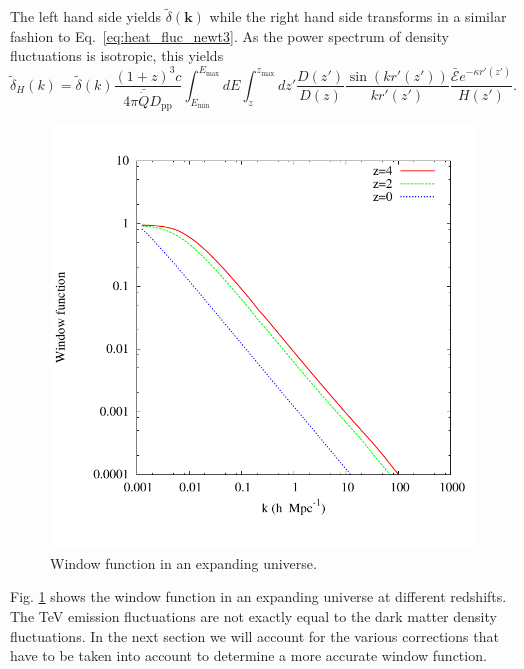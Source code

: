\documentclass[numberedappendix]{emulateapj}
\begin{document}
The left hand side yields $\tilde{\delta}(\mathbf{k})$ while the right hand side transforms in a similar fashion to Eq.~\eqref{eq:heat_fluc_newt3}. As the power spectrum of density fluctuations is isotropic, this yields
\begin{equation}
\label{eq:heat_fluc_exp1}
\tilde{\delta}_H(k)=\tilde{\delta}(k) \frac{(1+z)^3c}{4\pi\bar{\dot{Q}}D_{\mathrm{pp}}} \int_{E_{\mathrm{min}}}^{E_{\mathrm{max}}} dE\int_z^{z_{\mathrm{max}}} dz' \frac{D(z')}{D(z)}\frac{\sin(kr'(z'))}{kr'(z')} \frac{\bar{\mathcal{E}}e^{-\kappa r'(z')}} {H(z')}.
\end{equation}
\begin{figure}[h]
\centering
\includegraphics[width = .45\textwidth ]{window_nobiases-eps-converted-to}
\caption{Window function in an expanding universe.}
\label{fig:window_nobiases}
\end{figure}
Fig. \ref{fig:window_nobiases} shows the window function in an expanding universe at different redshifts. %
The TeV emission fluctuations are not exactly equal to the dark matter density fluctuations. In the next section we will account for the various corrections that have to be taken into account to determine a more accurate window function.
\end{document}
